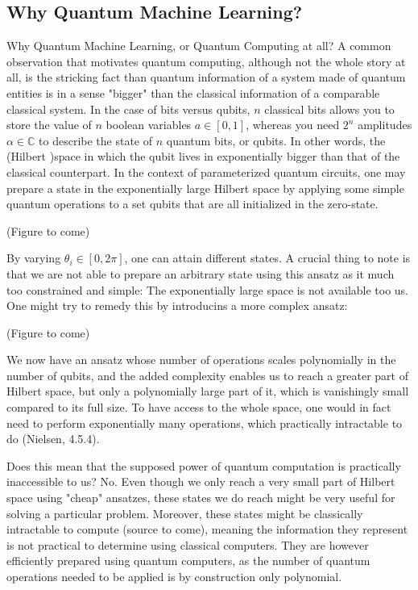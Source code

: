 \documentclass[]{article}
\begin{document}
\subsection{Why Quantum Machine Learning?}
Why Quantum Machine Learning, or Quantum Computing at all? A common observation that motivates quantum computing, although not the whole story at all, is the stricking fact than quantum information of a system made of quantum entities is in a sense "bigger" than the classical information of a comparable classical system. In the case of bits versus qubits, $n$ classical bits allows you to store the value of $n$ boolean variables $a \in [0,1]$, whereas you need $2^n$ amplitudes $\alpha \in \mathbb{C}$ to describe the state of $n$ quantum bits, or qubits. In other words, the (Hilbert )space in which the qubit lives in exponentially bigger than that of the classical counterpart. In the context of parameterized quantum circuits, one may prepare a state in the exponentially large Hilbert space by applying some simple quantum operations to a set qubits that are all initialized in the zero-state.

(Figure to come)

By varying $\theta_i \in [0, 2\pi]$, one can attain different states. A crucial thing to note is that we are not able to prepare an arbitrary state using this ansatz as it much too constrained and simple: The exponentially large space is not available too us. One might try to remedy this by introducins a more complex ansatz:

(Figure to come)

We now have an ansatz whose number of operations scales polynomially in the number of qubits, and the added complexity enables us to reach a greater part of Hilbert space, but only a polynomially large part of it, which is vanishingly small compared to its full size. To have access to the whole space, one would in fact need to perform exponentially many operations, which practically intractable to do (Nielsen, 4.5.4). 

Does this mean that the supposed power of quantum computation is practically inaccessible to us? No. Even though we only reach a very small part of Hilbert space using "cheap" ansatzes, these states we do reach might be very useful for solving a particular problem. Moreover, these states might be classically intractable to compute (source to come), meaning the information they represent is not practical to determine using classical computers. They are however efficiently prepared using quantum computers, as the number of quantum operations needed to be applied is by construction only polynomial.
\end{document}
